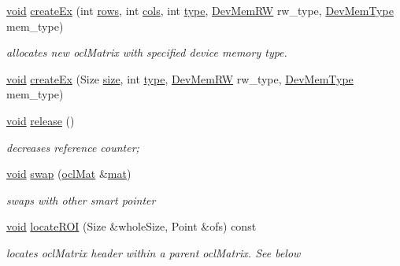 \begin{DoxyCompactItemize}
\item 
\hyperlink{legacy_8hpp_a8bb47f092d473522721002c86c13b94e}{void} \hyperlink{classcv_1_1ocl_1_1oclMat_a25f73dfb1e968f7068174d64383ff9ff}{create\-Ex} (int \hyperlink{classcv_1_1ocl_1_1oclMat_a1ccf0125fff51e419aa89b144ed511be}{rows}, int \hyperlink{classcv_1_1ocl_1_1oclMat_ac814acb1fd2613d43e5fbb9c2166ac9f}{cols}, int \hyperlink{classcv_1_1ocl_1_1oclMat_acf6fe0735d1dac151e2c301f01470827}{type}, \hyperlink{namespacecv_1_1ocl_a80a07717be48231d1ad6002ecd66729c}{Dev\-Mem\-R\-W} rw\-\_\-type, \hyperlink{namespacecv_1_1ocl_a06a87c6cbc228b6ee12b32dd5c27c52c}{Dev\-Mem\-Type} mem\-\_\-type)
\begin{DoxyCompactList}\small\item\em allocates new ocl\-Matrix with specified device memory type. \end{DoxyCompactList}\item 
\hyperlink{legacy_8hpp_a8bb47f092d473522721002c86c13b94e}{void} \hyperlink{classcv_1_1ocl_1_1oclMat_ac88dc143ee820b06f5a677c70cbade3a}{create\-Ex} (Size \hyperlink{classcv_1_1ocl_1_1oclMat_a21384709f0d43efd26d0c70edc7adf8a}{size}, int \hyperlink{classcv_1_1ocl_1_1oclMat_acf6fe0735d1dac151e2c301f01470827}{type}, \hyperlink{namespacecv_1_1ocl_a80a07717be48231d1ad6002ecd66729c}{Dev\-Mem\-R\-W} rw\-\_\-type, \hyperlink{namespacecv_1_1ocl_a06a87c6cbc228b6ee12b32dd5c27c52c}{Dev\-Mem\-Type} mem\-\_\-type)
\item 
\hyperlink{legacy_8hpp_a8bb47f092d473522721002c86c13b94e}{void} \hyperlink{classcv_1_1ocl_1_1oclMat_a2a0c869ae649fe790de272feb7989b33}{release} ()
\begin{DoxyCompactList}\small\item\em decreases reference counter; \end{DoxyCompactList}\item 
\hyperlink{legacy_8hpp_a8bb47f092d473522721002c86c13b94e}{void} \hyperlink{classcv_1_1ocl_1_1oclMat_a851539016beb446ae6e5752fe11d5ed6}{swap} (\hyperlink{classcv_1_1ocl_1_1oclMat}{ocl\-Mat} \&\hyperlink{imgproc__c_8h_ad9325e85114e7b9ab738a23b62ea10a0}{mat})
\begin{DoxyCompactList}\small\item\em swaps with other smart pointer \end{DoxyCompactList}\item 
\hyperlink{legacy_8hpp_a8bb47f092d473522721002c86c13b94e}{void} \hyperlink{classcv_1_1ocl_1_1oclMat_ac5162869d68bd8a82339b2287136c079}{locate\-R\-O\-I} (Size \&whole\-Size, Point \&ofs) const 
\begin{DoxyCompactList}\small\item\em locates ocl\-Matrix header within a parent ocl\-Matrix. See below \end{DoxyCompactList}\item 

\end{DoxyCompactItemize}
